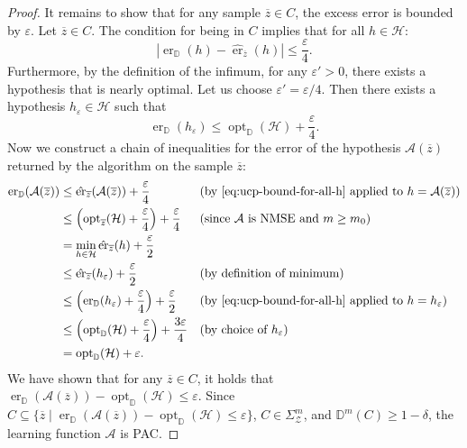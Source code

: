 \begin{proof}
    It remains to show that for any sample $\overline{z} \in C$, the excess error is bounded by $\varepsilon$. Let $\overline{z} \in C$. The condition for being in $C$ implies that for all $h \in \mathcal{H}$:
    \begin{equation} \label{eq:ucp-bound-for-all-h}
    |\operatorname{er}_{\mathbb{D}}(h) - \hat{\operatorname{er}}_{\overline{z}}(h)| \le \frac{\varepsilon}{4}.
    \end{equation}
    Furthermore, by the definition of the infimum, for any $\varepsilon' > 0$, there exists a hypothesis that is nearly optimal. Let us choose $\varepsilon' = \varepsilon/4$. Then there exists a hypothesis $h_\varepsilon \in \mathcal{H}$ such that
    \[
        \operatorname{er}_{\mathbb{D}}(h_\varepsilon) \le \operatorname{opt}_{\mathbb{D}}(\mathcal{H}) + \frac{\varepsilon}{4}.
    \]
    Now we construct a chain of inequalities for the error of the hypothesis $\mathcal{A}(\overline{z})$ returned by the algorithm on the sample $\overline{z}$:
    \begin{align*}
        \operatorname{er}_{\mathbb{D}}(\mathcal{A}(\overline{z})) &\le \hat{\operatorname{er}}_{\overline{z}}(\mathcal{A}(\overline{z})) + \frac{\varepsilon}{4} && \text{(by \eqref{eq:ucp-bound-for-all-h} applied to } h = \mathcal{A}(\overline{z})\text{)} \\
        &\le \left( \operatorname{opt}_{\overline{z}}(\mathcal{H}) + \frac{\varepsilon}{4} \right) + \frac{\varepsilon}{4} && \text{(since } \mathcal{A} \text{ is NMSE and } m \ge m_0\text{)} \\
        &= \min_{h \in \mathcal{H}} \hat{\operatorname{er}}_{\overline{z}}(h) + \frac{\varepsilon}{2} \\
        &\le \hat{\operatorname{er}}_{\overline{z}}(h_\varepsilon) + \frac{\varepsilon}{2} && \text{(by definition of minimum)} \\
        &\le \left( \operatorname{er}_{\mathbb{D}}(h_\varepsilon) + \frac{\varepsilon}{4} \right) + \frac{\varepsilon}{2} && \text{(by \eqref{eq:ucp-bound-for-all-h} applied to } h = h_\varepsilon\text{)} \\
        &\le \left( \operatorname{opt}_{\mathbb{D}}(\mathcal{H}) + \frac{\varepsilon}{4} \right) + \frac{3\varepsilon}{4} && \text{(by choice of } h_\varepsilon\text{)} \\
        &= \operatorname{opt}_{\mathbb{D}}(\mathcal{H}) + \varepsilon.
    \end{align*}
    We have shown that for any $\overline{z} \in C$, it holds that $\operatorname{er}_{\mathbb{D}}(\mathcal{A}(\overline{z})) - \operatorname{opt}_{\mathbb{D}}(\mathcal{H}) \le \varepsilon$. Since $C \subseteq \{ \overline{z} \mid \operatorname{er}_{\mathbb{D}}(\mathcal{A}(\overline{z})) - \operatorname{opt}_{\mathbb{D}}(\mathcal{H}) \le \varepsilon \}$, $C \in \Sigma_{\mathcal{Z}}^m$, and $\mathbb{D}^m(C) \ge 1-\delta$, the learning function $\mathcal{A}$ is PAC.
\end{proof}

